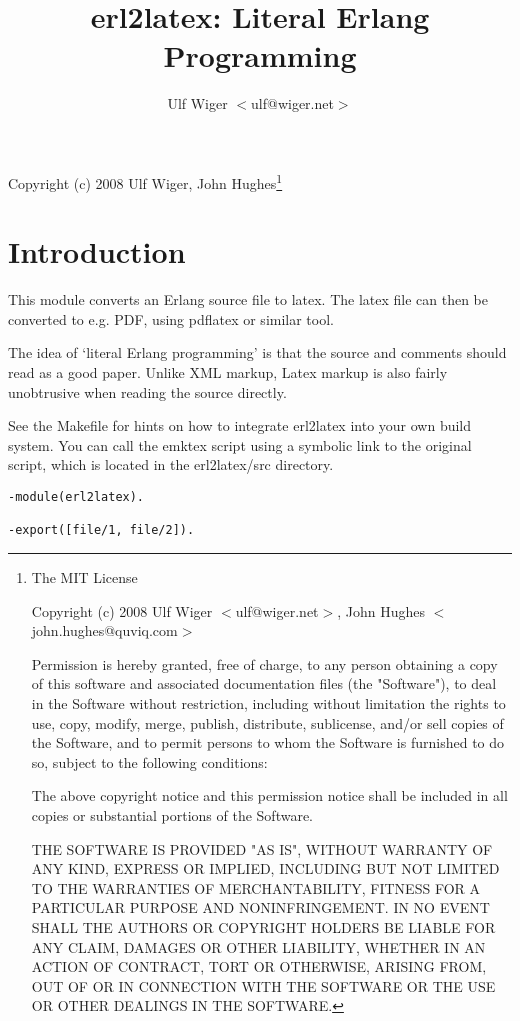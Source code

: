 \documentclass[a4paper,12pt]{article}
\newenvironment{mylisting}
{\begin{list}{}{\setlength{\leftmargin}{1em}}\item\scriptsize\bfseries}
{\end{list}}
\begin{document}
\title{erl2latex: Literal Erlang Programming}
\author{Ulf Wiger $<$ulf@wiger.net$>$}
\maketitle

Copyright (c) 2008 Ulf Wiger, John Hughes\footnote{
\tiny{The MIT License

Copyright (c) 2008 Ulf Wiger $<$ulf@wiger.net$>$,
John Hughes $<$john.hughes@quviq.com$>$

Permission is hereby granted, free of charge, to any person obtaining a
copy of this software and associated documentation files (the "Software"),
to deal in the Software without restriction, including without limitation
the rights to use, copy, modify, merge, publish, distribute, sublicense,
and/or sell copies of the Software, and to permit persons to whom the
Software is furnished to do so, subject to the following conditions:

The above copyright notice and this permission notice shall be included in
all copies or substantial portions of the Software.

THE SOFTWARE IS PROVIDED "AS IS", WITHOUT WARRANTY OF ANY KIND, EXPRESS OR
IMPLIED, INCLUDING BUT NOT LIMITED TO THE WARRANTIES OF MERCHANTABILITY,
FITNESS FOR A PARTICULAR PURPOSE AND NONINFRINGEMENT. IN NO EVENT SHALL
THE AUTHORS OR COPYRIGHT HOLDERS BE LIABLE FOR ANY CLAIM, DAMAGES OR OTHER
LIABILITY, WHETHER IN AN ACTION OF CONTRACT, TORT OR OTHERWISE, ARISING 
FROM, OUT OF OR IN CONNECTION WITH THE SOFTWARE OR THE USE OR OTHER
DEALINGS IN THE SOFTWARE.
}}
\section{Introduction}
This module converts an Erlang source file to latex. The latex file
can then be converted to e.g. PDF, using pdflatex or similar tool.

The idea of `literal Erlang programming' is that the source and comments
should read as a good paper. Unlike XML markup, Latex markup is also 
fairly unobtrusive when reading the source directly.

See the Makefile for hints on how to integrate erl2latex into your own
build system. You can call the emktex script using a symbolic link to
the original script, which is located in the erl2latex/src directory.
\begin{mylisting}
\begin{verbatim}
-module(erl2latex).

-export([file/1, file/2]).
\end{verbatim}
\end{mylisting}
\end{document}
